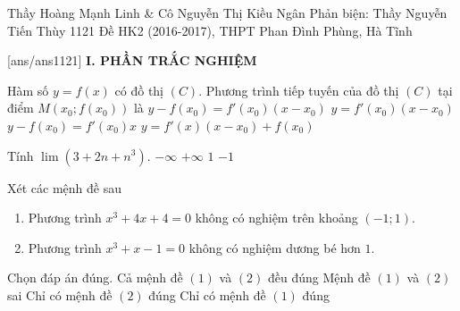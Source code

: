 \begin{name}
{Thầy Hoàng Mạnh Linh \& Cô Nguyễn Thị Kiều Ngân \newline Phản biện: Thầy Nguyễn Tiến Thùy}
{1121 Đề HK2 (2016-2017), THPT Phan Đình Phùng, Hà Tĩnh}%
	\end{name}
	\setcounter{ex}{0}\setcounter{bt}{0}
	[ans/ans1121]
\noindent\textbf{I. PHẦN TRẮC NGHIỆM}
\begin{ex}%
	Hàm số $y=f(x)$ có đồ thị $(C)$. Phương trình tiếp tuyến của đồ thị $(C)$ tại điểm $M(x_0;f(x_0))$ là
	\choice
	{\True $y-f(x_0)=f'(x_0)(x-x_0)$}
	{$y=f'(x_0)(x-x_0)$}
	{$y-f(x_0)=f'(x_0)x$}
	{$y=f'(x)(x-x_0)+f(x_0)$}
\end{ex}

\begin{ex}%
Tính $\lim(3+2n+n^3)$. 
	\choice
	{$-\infty$}
	{\True $+\infty$}
	{$1$}
	{$-1$}
\end{ex}

\begin{ex}%
	Xét các mệnh đề sau
	\begin{enumerate}[(1)]
		\item Phương trình $x^3+4x+4=0$ không có nghiệm trên khoảng $(-1;1)$.
		\item Phương trình $x^3+x-1=0$ không có nghiệm dương bé hơn $1$.
	\end{enumerate}
	Chọn đáp án đúng.
	\choice
	{Cả mệnh đề $(1)$ và $(2)$ đều đúng}
	{\True Mệnh đề $(1)$ và $(2)$ sai}
	{Chỉ có mệnh đề $(2)$ đúng}
	{Chỉ có mệnh đề $(1)$ đúng}
\end{ex}

